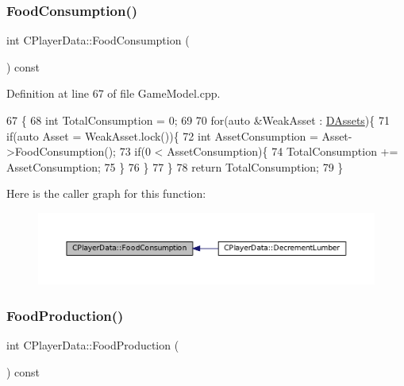 \subsubsection{\texorpdfstring{Food\+Consumption()}{FoodConsumption()}}
{\footnotesize\ttfamily int C\+Player\+Data\+::\+Food\+Consumption (\begin{DoxyParamCaption}{ }\end{DoxyParamCaption}) const}



Definition at line 67 of file Game\+Model.\+cpp.


\begin{DoxyCode}
67                                       \{
68     \textcolor{keywordtype}{int} TotalConsumption = 0;
69     
70     \textcolor{keywordflow}{for}(\textcolor{keyword}{auto} &WeakAsset : \hyperlink{classCPlayerData_a1d7dd355facf52db6242e3554373906c}{DAssets})\{
71         \textcolor{keywordflow}{if}(\textcolor{keyword}{auto} Asset = WeakAsset.lock())\{
72             \textcolor{keywordtype}{int} AssetConsumption = Asset->FoodConsumption();
73             \textcolor{keywordflow}{if}(0 < AssetConsumption)\{
74                 TotalConsumption += AssetConsumption;    
75             \}
76         \}
77     \}
78     \textcolor{keywordflow}{return} TotalConsumption;
79 \}
\end{DoxyCode}
Here is the caller graph for this function\+:\nopagebreak
\begin{figure}[H]
\begin{center}
\leavevmode
\includegraphics[width=350pt]{classCPlayerData_a45b5ba15a17796acdbaca7eacc7532d0_icgraph}
\end{center}
\end{figure}
\hypertarget{classCPlayerData_ae71ad19439d31ba0eb7f59809885ed6d}{}\label{classCPlayerData_ae71ad19439d31ba0eb7f59809885ed6d} 
\subsubsection{\texorpdfstring{Food\+Production()}{FoodProduction()}}
{\footnotesize\ttfamily int C\+Player\+Data\+::\+Food\+Production (\begin{DoxyParamCaption}{ }\end{DoxyParamCaption}) const}



